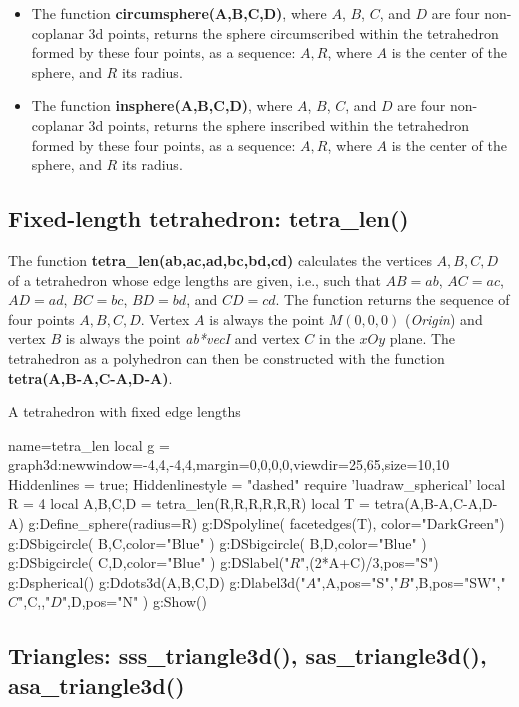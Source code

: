 \begin{itemize}
    \item The function \textbf{circumsphere(A,B,C,D)}, where $A$, $B$, $C$, and $D$ are four non-coplanar 3d points, returns the sphere circumscribed within the tetrahedron formed by these four points, as a sequence: $A,R$, where $A$ is the center of the sphere, and $R$ its radius.
    \item The function \textbf{insphere(A,B,C,D)}, where $A$, $B$, $C$, and $D$ are four non-coplanar 3d points, returns the sphere inscribed within the tetrahedron formed by these four points, as a sequence: $A,R$, where $A$ is the center of the sphere, and $R$ its radius.
\end{itemize}

\subsection{Fixed-length tetrahedron: tetra\_len()}

The function \textbf{tetra\_len(ab,ac,ad,bc,bd,cd)} calculates the vertices $A,B,C,D$ of a tetrahedron whose edge lengths are given, i.e., such that $AB=ab$, $AC=ac$, $AD=ad$, $BC=bc$, $BD=bd$, and $CD=cd$. The function returns the sequence of four points $A,B,C,D$. Vertex $A$ is always the point $M(0,0,0)$ (\emph{Origin}) and vertex $B$ is always the point \emph{ab*vecI} and vertex $C$ in the $xOy$ plane. The tetrahedron as a polyhedron can then be constructed with the function \textbf{tetra(A,B-A,C-A,D-A)}.

\begin{demo}{A tetrahedron with fixed edge lengths}
\begin{luadraw}{name=tetra_len}
local g = graph3d:new{window={-4,4,-4,4},margin={0,0,0,0},viewdir={25,65},size={10,10}}
Hiddenlines = true; Hiddenlinestyle = "dashed"
require 'luadraw_spherical'
local R = 4
local A,B,C,D = tetra_len(R,R,R,R,R,R)
local T = tetra(A,B-A,C-A,D-A)
g:Define_sphere({radius=R})
g:DSpolyline( facetedges(T), {color="DarkGreen"})
g:DSbigcircle( {B,C},{color="Blue"} )
g:DSbigcircle( {B,D},{color="Blue"} )
g:DSbigcircle( {C,D},{color="Blue"}  )
g:DSlabel("$R$",(2*A+C)/3,{pos="S"})
g:Dspherical()
g:Ddots3d({A,B,C,D})
g:Dlabel3d("$A$",A,{pos="S"},"$B$",B,{pos="SW"},"$C$",C,{},"$D$",D,{pos="N"} )
g:Show()
\end{luadraw}
\end{demo}

\subsection{Triangles: sss\_triangle3d(), sas\_triangle3d(), asa\_triangle3d()}

